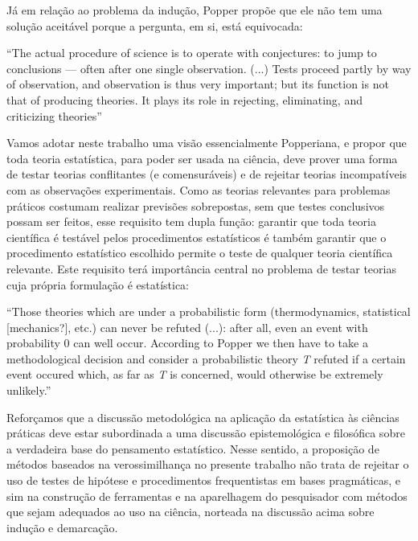 Já em relação ao problema da indução, Popper propõe que ele não tem uma solução aceitável porque a pergunta, em si, está
equivocada:

``The actual procedure of science is to operate with conjectures: to jump to conclusions — often after one single observation.
(...) Tests proceed partly by way of observation, and observation is thus very important; but its function is not that of 
producing theories. It plays its role in rejecting, eliminating, and criticizing theories'' \citep{Popper63}

Vamos adotar neste trabalho uma visão essencialmente Popperiana, e propor que toda teoria estatística, para poder ser
usada na ciência, deve prover uma forma de testar teorias conflitantes (e comensuráveis)
e de rejeitar teorias incompatíveis com as observações experimentais. Como as teorias relevantes para problemas práticos costumam
realizar previsões sobrepostas, sem que testes conclusivos possam ser feitos, esse requisito tem dupla função: garantir
que toda teoria científica é testável pelos procedimentos estatísticos é também garantir que o procedimento estatístico escolhido
permite o teste de qualquer teoria científica relevante. Este requisito terá importância central no problema de testar
teorias cuja própria formulação é estatística:

``Those theories which are under a probabilistic form (thermodynamics, statistical [mechanics?], etc.) can never be refuted (...):
after all, even an event with probability 0 can well occur. According to Popper we then have to take a methodological decision
and consider a probabilistic theory {\em T} refuted if a certain event occured which, as far as {\em T} is concerned, would 
otherwise be extremely unlikely.'' \citep{deFinetti2010}

Reforçamos que a discussão metodológica na aplicação da estatística às ciências práticas deve estar subordinada a uma discussão
epistemológica e filosófica sobre a verdadeira base do pensamento estatístico. Nesse sentido, a proposição de
métodos baseados na verossimilhança no presente trabalho não trata de rejeitar o uso de testes de hipótese 
e procedimentos frequentistas em
bases pragmáticas, e sim na construção de ferramentas e na aparelhagem do pesquisador com métodos que sejam
adequados ao uso na ciência, norteada na discussão acima sobre indução e demarcação.

